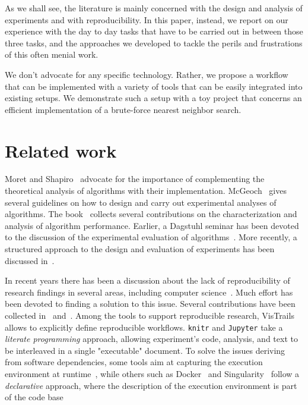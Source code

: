 \documentclass{llncs}
\begin{document}
As we shall see, the literature is mainly concerned with the design 
and analysis of
experiments
and with reproducibility.
In this paper, instead, we report on our experience with the day to day
tasks that have to be carried out in between those three tasks, and
the approaches we developed to tackle the perils and frustrations of this 
often menial work.

We don't advocate for any specific technology. Rather, we propose a workflow
that can be implemented with a variety of tools that can be easily integrated
into existing setups. We demonstrate such a setup with a toy project that concerns an efficient implementation of a brute-force nearest neighbor search.

\section{Related work}

Moret and Shapiro~\cite{DBLP:journals/jucs/MoretS01} advocate for the
importance of complementing the theoretical analysis of algorithms
with their implementation.
McGeoch~\cite{DBLP:reference/algo/McGeoch08} gives several guidelines on how to
design and carry out experimental analyses of algorithms.
The book~\cite{DBLP:books/sp/2010BCPP} collects several contributions
on the characterization and analysis of algorithm performance.
Earlier, a Dagstuhl seminar has been devoted to the discussion of the
experimental evaluation of algorithms~\cite{DBLP:conf/dagstuhl/2000ea}.
More recently, a structured approach to the design and evaluation
of experiments has been discussed in~\cite{DBLP:series/ncs/Bartz-BeielsteinP14}.
%

In recent years there has been a discussion about the lack of reproducibility
of research findings in several areas, including 
computer science~\cite{DBLP:journals/cacm/CollbergP16,Hutson725}.
Much effort has been devoted to finding a solution to this issue. Several
contributions have been collected in~\cite{stodden2014implementing} 
and~\cite{kitzes2017practice}.
Among the tools to support reproducible research, 
VisTrails~\cite{DBLP:conf/sigmod/CallahanFSSSV06} allows to
explicitly define reproducible workflows.
\texttt{knitr} and \texttt{Jupyter} take a \emph{literate programming}
approach, allowing experiment's code, analysis, and text to be interleaved
in a single "executable" document.
To solve the issues deriving from software dependencies,
some tools aim at capturing the execution
environment at runtime~\cite{DBLP:journals/cse/Guo12,davison2014sumatra,DBLP:journals/jossw/RampinCSFS16},
while others such as Docker~\cite{DBLP:journals/sigops/Boettiger15}
and Singularity~\cite{kurtzer2017singularity} follow a \emph{declarative}
approach, where the description of the execution environment is part
of the code base
\end{document}
